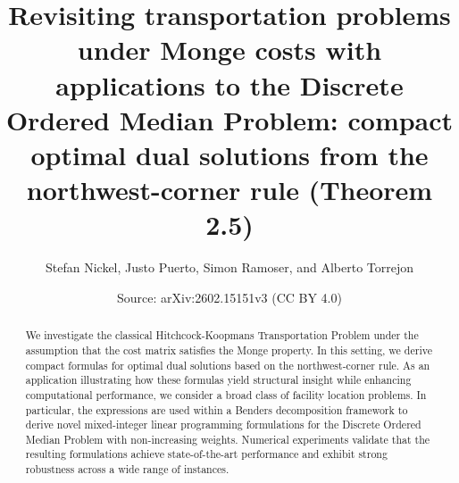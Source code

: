 \documentclass[10pt,a4paper]{amsart}
\title[Revisiting transportation problems under Monge costs]{Revisiting transportation problems under Monge costs with applications to the Discrete Ordered Median Problem: compact optimal dual solutions from the northwest-corner rule (Theorem 2.5)}
\author[Stefan Nickel, Justo Puerto, Simon Ramoser, and Alberto Torrejon]{Stefan Nickel, Justo Puerto, Simon Ramoser, and Alberto Torrejon}
\date{Source: arXiv:2602.15151v3 (CC BY 4.0)}
\begin{document}
\maketitle
\begin{abstract}
We investigate the classical Hitchcock-Koopmans Transportation Problem under the assumption that the cost matrix satisfies the Monge property. In this setting, we derive compact formulas for optimal dual solutions based on the northwest-corner rule. As an application illustrating how these formulas yield structural insight while enhancing computational performance, we consider a broad class of facility location problems. In particular, the expressions are used within a Benders decomposition framework to derive novel mixed-integer linear programming formulations for the Discrete Ordered Median Problem with non-increasing weights. Numerical experiments validate that the resulting formulations achieve state-of-the-art performance and exhibit strong robustness across a wide range of instances.
\end{abstract}
\end{document}
